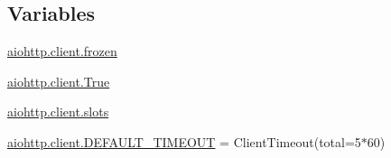 \subsection*{Variables}
\begin{DoxyCompactItemize}
\item 
\hyperlink{namespaceaiohttp_1_1client_ad581b3b167bb0890b7c121cc3f579f7d}{aiohttp.\+client.\+frozen}
\item 
\hyperlink{namespaceaiohttp_1_1client_a90d6973ce7853fef04691d60eb176356}{aiohttp.\+client.\+True}
\item 
\hyperlink{namespaceaiohttp_1_1client_aba5717f3d9d62ebdf08046173dee44b7}{aiohttp.\+client.\+slots}
\item 
\hyperlink{namespaceaiohttp_1_1client_a88c1fd64213b45acd682fb67d539a202}{aiohttp.\+client.\+D\+E\+F\+A\+U\+L\+T\+\_\+\+T\+I\+M\+E\+O\+UT} = Client\+Timeout(total=5$\ast$60)
\end{DoxyCompactItemize}
